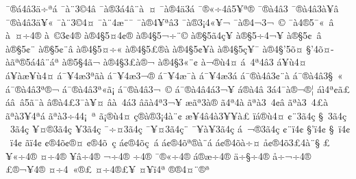 {^^af^^ae^^e14^^e23^^e4^^f7^^aa^^e1
^^af^^e0^^a83^^a94^^e2
^^af^^e0^^ae3^^e14^^e2^^a8^^e0^^a0^^a4
^^af^^e0^^ae4^^e43^^e1
^^af^^ae^^ab^^f74^^e25^^a5^^aa^^ae^^ad
^^af^^ae^^e04^^e23^^ad
^^af^^ae^^e04^^e23^^e0^^a5^^e2
^^af^^ae^^e04^^e23^^e4^^a5^^ab
^^af^^e0^^a83^^a94^^a4
^^af^^e0^^a84^^ad^^e6^^a8^^af
^^af^^e0^^ae4^^a5^^aa^^e23^^ad
^^af^^e0^^ae3^^a14^^ab^^a5^^ac
^^af^^e0^^ae4^^ac3^^ac^^a0^^a9
^^af^^e04^^ae5^^af^^ab^^a0^^e2
^^e0^^a0^^a4^^f74^^ae
^^e0^^a0^^a93^^a24^^ad^^ae
^^e0^^ae4^^a75^^a44^^a2^^ae
^^e0^^ae4^^a75^^ac^^f7^^ad^^ad^^a8^^a9
^^e0^^ae^^a75^^e34^^e7^^a5^^ad
^^e0^^ae^^a75^^f74^^ac^^a5^^ad
^^e0^^ae^^a75^^a2^^a0^^ad^^e2
^^e0^^ae^^a75^^a2^^a8^^ad
^^e0^^ae^^a75^^a2^^a8^^e2
^^e0^^ae4^^a75^^a4^^f7^^ab
^^e0^^ae4^^a75^^a3^^ae^^e0
^^e0^^ae4^^a75^^a2^^a5^^e0
^^e0^^ae4^^a75^^e7^^a5^^af
^^e0^^ae4^^a7'5^^f5^^a4^^ad
^^a7'4^^f5^^a4^^ad
^^e0^^e3^^aa^^ae5^^e14^^e2^^a8^^e1^^aa
^^e0^^ae5^^a74^^e3^^ac
^^e0^^ae4^^a73^^a3^^e0^^ae^^ac
^^e0^^ae4^^a73^^ab^^a8^^a2
^^e0^^ac^^ae^^f94^^a4
^^e1^^a0^^ad4^^aa4^^e23
^^e1^^a5^^f94^^a4
^^e1^^a5^^e0^^e6^^a5^^f94^^a4
^^e1^^af^^a54^^e63^^aa^^e3^^e0
^^e1^^af^^a54^^e63^^ac^^ae^^ad
^^e1^^af^^a54^^e6^^af^^e0
^^e1^^af^^a54^^e63^^e1
^^e1^^af^^ae^^e04^^e23^^a2^^a8^^e0
^^e1^^af^^ae^^e04^^e23^^a7^^a0^^ab
^^e1^^af^^ae^^e04^^e23^^aa^^ae^^ac
^^e1^^af^^ae^^e04^^e23^^aa^^ab^^e3^^a1
^^e1^^af^^ae^^e04^^e23^^ac^^a0^^a9
^^e1^^af^^ae^^e04^^e24^^e13^^ac^^a5
^^e1^^ae^^e04^^e2^^ad
3^^e14^^af^^e0^^ae^^ac^^ae^^a6
^^e1^^ec4^^aa^^a2^^e3^^a3
^^e1^^e2^^a0^^e25^^e3^^af^^e0
^^e2^^ae^^e04^^a33^^af^^e0^^a5^^a4
^^e2^^e0^^a0^^ad4^^e13
^^e2^^e3^^e04^^aa3^^ac^^a5^^ad
^^e6^^e3^^aa3^^e0^^ae
^^e34^^aa4^^e0
^^e3^^aa^^e03^^a04^^a2^^e2
^^e3^^aa^^e03^^a04^^a3^^e0
^^e3^^aa^^e03^^a54^^aa^^e1
^^e3^^aa^^e03^^f74^^ad4^^a1^^a0^^ad^^aa 
^^e3^^a1^^ae^^f94^^a4
^^e7^^ae^^e0^^ad^^ae3^^a14^^e0^^a8^^a2
^^e6^^a5^^ad4^^e24^^e03^^a5^^ad^^a5^^e0^^a3
^^ef^^e1^^ae^^f94^^a4
^^a2^^a83^^e34^^e7
^^a7^^a03^^e34^^e7
^^ad^^a03^^e34^^e7
^^ad^^a5^^a4^^ae3^^e34^^e7
^^ad^^a53^^e34^^e7
^^af^^f7^^a43^^e34^^e7
^^af^^a5^^a43^^e34^^e7^^a8
^^af^^a5^^e0^^a53^^e34^^e7
^^e1^^a0^^ac^^ae3^^e34^^e7
^^a2^^a8^^ef4^^a2
^^a7'^^ef4^^a2
^^a7^^a0^^ef4^^a2
^^ad^^a0^^ef4^^a2
^^e3^^ef4^^a2
^^a2^^ae4^^f5^^a2^^ae^^a4
^^a2^^ae4^^f5^^ad^^a0^^e7
^^e1^^a2^^ae4^^f5^^e7^^a0^^e1
^^e1^^a2^^ae4^^f5^^aa^^ae^^e0^^a8^^e1
^^e1^^a2^^ae4^^f5^^e0^^f7^^a4
^^e5^^a2^^ae4^^f53^^a34^^e0^^a8^^a7
^^a3^^a5^^ab^^f74^^ae
^^a4^^f74^^ae
^^a5^^e2^^f74^^ae
^^ac^^f74^^ae
^^f74^^ae^^ad
^^af^^ae^^ab^^f74^^ae
^^e1^^ae^^e6^^f74^^ae
^^e4^^f7^^a7^^f74^^ae
^^e5^^f7^^ac^^f74^^ae
^^a3^^ae^^ac^^a54^^ae
^^a4^^f74^^a0^^ab^^ae^^a3
^^a4^^f74^^ae^^a3^^a5^^ad
^^a4^^a5^^ef4^^aa
^^ae^^ae4^^a4^^a8^^ad^^ae^^aa
}
